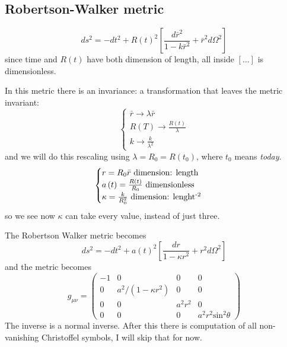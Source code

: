\subsection{Robertson-Walker metric}
\[
	ds^{2} = -dt^{2} + R\left( t \right)^{2}\left[ \frac{d\bar{r}^{2}}{1 - k \bar{r}^{2}} + \bar{r}^{2}d\Omega ^{2} \right]
\]
since time and $R\left( t \right)$ have both dimension of length, all inside $\left[ \ldots  \right]$ is dimensionless.\par
In this metric there is an invariance: a transformation that leaves the metric invariant:
\[
\begin{cases}
	\bar{r} \to \lambda \bar{r} \\
R\left( T \right) \to \frac{R\left( t \right)}{\lambda } \\
k \to  \frac{k}{\lambda ^{2}}
\end{cases}
\]
and we will do this rescaling using $\lambda = R_{0} = R\left( t_{0} \right)$, where $t_{0}$ means \emph{today}.
\[
\begin{cases}
	r = R_{0}\bar{r}  \text{ dimension: length }\\	
a\left( t \right) = \frac{R\left( t \right)}{R_{0}} \text{ dimensionless }\\
\kappa = \frac{k}{R_{0}^{2}} \text{ dimension: lenght\textsuperscript{-2} }
\end{cases}
\]
so we see now $\kappa $ can take every value, instead of just three.\par
The Robertson Walker metric becomes
\[
ds^{2} = -dt^{2} + a\left( t \right)^{2}\left[ \frac{dr}{1- \kappa r^{2}} + r^{2} d\Omega ^{2} \right]
\]
and the metric becomes
\[
g_{\mu \nu  } = \begin{pmatrix}
-1 & 0 & 0 & 0 \\
0 & a^{2}/\left( 1- \kappa r^{2} \right) & 0 & 0 \\
0 & 0 & a^{2}r^{2} & 0 \\
0 & 0 & 0 & a^{2}r^{2}\text{sin}^{2}\theta 
\end{pmatrix} 
\]
The inverse is a normal inverse. After this there is computation of all non-vanishing Christoffel symbols, I will skip that for now.

